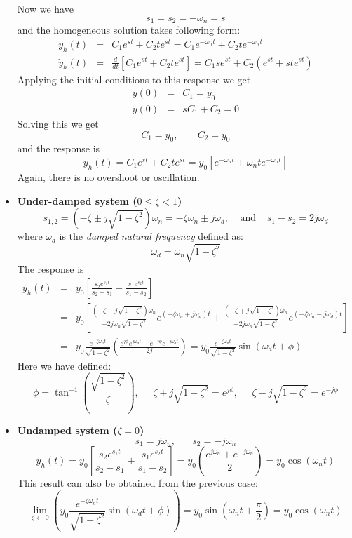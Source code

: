 \begin{itemize}
  Now we have
  \[ s_1=s_2=-\omega_n=s \]
  and the homogeneous solution takes following form:
  \begin{eqnarray}
    y_h(t)&=&C_1 e^{st}+C_2 t e^{st}=C_1 e^{-\omega_nt}+C_2 t e^{-\omega_nt} 
    \nonumber \\
    \dot{y}_h(t)&=&\frac{d}{dt}[C_1 e^{st}+C_2 t e^{st}]=C_1se^{st}+C_2(e^{st}+ste^{st})  
    \nonumber 
  \end{eqnarray}
  Applying the initial conditions to this response we get
  \begin{eqnarray}
    y(0)&=&C_1=y_0  \nonumber \\
    \dot{y}(0)&=&s C_1+C_2=0 \nonumber 
  \end{eqnarray}
  Solving this we get 
  \[ 
  C_1=y_0, \;\;\;\;\;\;\;C_2=y_0
  \]
  and the response is
  \[ y_h(t)=C_1 e^{st}+C_2 t e^{st}=y_0\left[ e^{-\omega_nt}+\omega_n t e^{-\omega_nt}\right] \]
  Again, there is no overshoot or oscillation.
\item {\bf Under-damped system ($0 \le \zeta < 1$)}
  \[ s_{1,2}=(-\zeta\pm j \sqrt{1-\zeta^2})\omega_n=-\zeta\omega_n\pm j\omega_d,\;\;\;\;\mbox{and}\;\;\;\;
  s_1-s_2=2j\omega_d  \]
  where $\omega_d$ is the {\em damped natural frequency} defined as:
  \[ \omega_d=\omega_n\sqrt{1-\zeta^2} \]
  The response is
  \begin{eqnarray}
    y_h(t)&=&y_0 \left[ \frac{s_2 e^{s_1t}}{s_2-s_1}+\frac{s_1 e^{s_2t}}{s_1-s_2} \right]
    \nonumber \\
    &=&y_0\left[ \frac{(-\zeta-j\sqrt{1-\zeta^2})\omega_n}{-2j\omega_n\sqrt{1-\zeta^2}} e^{(-\zeta\omega_n+j\omega_d)t}
                +\frac{(-\zeta+j\sqrt{1-\zeta^2})\omega_n}{-2j\omega_n\sqrt{1-\zeta^2}} e^{(-\zeta\omega_n-j\omega_d)t} \right]
    \nonumber \\
    &=&y_0\frac{e^{-\zeta\omega_nt}}{\sqrt{1-\zeta^2}} \left(\frac{e^{j\phi}e^{j\omega_dt}-e^{-j\phi}e^{-j\omega_dt}}{2j}\right)
    =y_0\frac{e^{-\zeta\omega_nt}}{\sqrt{1-\zeta^2}} \sin(\omega_dt+\phi)
    \nonumber
  \end{eqnarray}
  Here we have defined:
  \[ 
  \phi=\tan^{-1}\left( \frac{\sqrt{1-\zeta^2}}{\zeta} \right),\;\;\;\;\;
  \zeta+j\sqrt{1-\zeta^2}=e^{j\phi},\;\;\;\;\;\zeta-j\sqrt{1-\zeta^2}=e^{-j\phi}
  \]
\item {\bf Undamped system ($ \zeta =0$)}
  \[ s_1=j\omega_n,\;\;\;\;\;\;s_2=-j\omega_n \]
  \[ y_h(t)=y_0 \left[ \frac{s_2 e^{s_1t}}{s_2-s_1}+\frac{s_1 e^{s_2t}}{s_1-s_2} \right]
  =y_0\left(\frac{e^{j\omega_n}+e^{-j\omega_n}}{2}\right)=y_0\cos(\omega_nt) \]
  This result can also be obtained from the previous case:
  \[ \lim_{\zeta\leftarrow 0} \left(y_0\frac{e^{-\zeta\omega_nt}}{\sqrt{1-\zeta^2}} \sin(\omega_dt+\phi) \right)
  =y_0\sin(\omega_nt+\frac{\pi}{2})=y_0\cos(\omega_nt) \]
\end{itemize}


